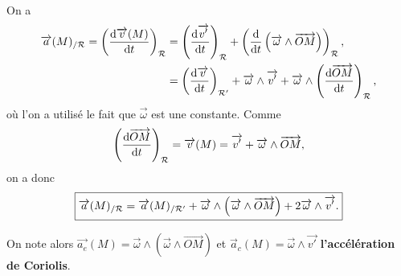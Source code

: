             On a 
            \begin{align*}
                \vec{a}(M)_{/\calR}=\left(\frac{\rmd\vec{v}(M)}{\rmd t}\right)_{\calR}
                &=\left(\frac{\rmd\vec{v'}}{\rmd t}\right)_{\calR}+\left(\frac{\rmd}{\rmd t}\left(\vec{\omega}\wedge\vec{OM}\right)\right)_{\calR},\\
                &=\left(\frac{\rmd\vec{v}}{\rmd t}\right)_{\calR'}+\vec{\omega}\wedge\vec{v'}+\vec{\omega}\wedge\left(\frac{\rmd\vec{OM}}{\rmd t}\right)_{\calR},
            \end{align*}
            où l'on a utilisé le fait que $\vec{\omega}$ est une constante. Comme 
            \begin{equation*}
                \left(\dfrac{\rmd\vec{OM}}{\rmd t}\right)_{\calR}=\vec{v}(M)=\vec{v'}+\vec{\omega}\wedge\vec{OM},
            \end{equation*}
            on a donc 
            \begin{equation*}
                \boxed{
                    \vec{a}(M)_{/\calR}=\vec{a}(M)_{/\calR'}+\vec{\omega}\wedge\left(\vec{\omega}\wedge\vec{OM}\right)+2\vec{\omega}\wedge\vec{v'}.
                }
            \end{equation*}

            On note alors $\vec{a_e}(M)=\vec{\omega}\wedge\left(\vec{\omega}\wedge\vec{OM}\right)$ et $\vec{a}_c(M)=\vec{\omega}\wedge\vec{v'}$ \textbf{l'accélération de Coriolis}.

